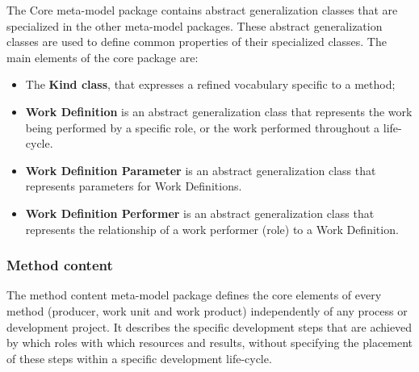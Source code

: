 The Core meta-model package contains abstract generalization classes that are specialized in the other meta-model packages. These abstract generalization classes are used to define
common properties of their specialized classes. The main elements of the core package are:
\begin{itemize}
\item The \textbf{Kind class}, that expresses a refined vocabulary specific to a method;
\item \textbf{Work Definition} is an abstract generalization class that represents the work being performed by a specific role, or the work performed throughout a life-cycle.
\item \textbf{Work Definition Parameter} is an abstract generalization class that represents parameters for Work Definitions.
\item \textbf{Work Definition Performer} is an abstract generalization class that represents the relationship of a work performer (role) to a Work Definition.
\end{itemize}

\subsubsection{Method content}

The method content meta-model package defines the core elements of every method (producer, work unit and work product) independently of any process or development project. It describes the specific development steps that are achieved by which roles with which resources and results, without specifying the placement of these steps within a specific
development life-cycle.


